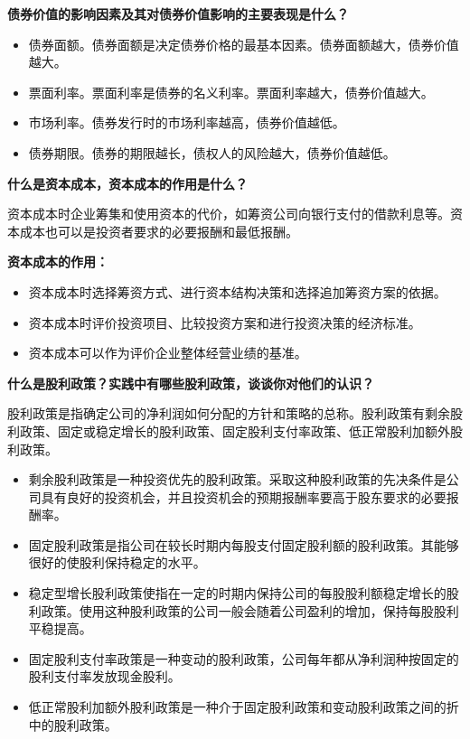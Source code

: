 \documentclass[
  10pt,
  twoside,
  openany,
  b5paper, %
  colorscheme = black, %
  xits = false,
]{qyxf-book}
\begin{document}
 \textbf{债券价值的影响因素及其对债券价值影响的主要表现是什么？}

\begin{note}
	\begin{itemize}
		\item 债券面额。债券面额是决定债券价格的最基本因素。债券面额越大，债券价值越大。
		\item 票面利率。票面利率是债券的名义利率。票面利率越大，债券价值越大。
		\item 市场利率。债券发行时的市场利率越高，债券价值越低。
		\item 债券期限。债券的期限越长，债权人的风险越大，债券价值越低。
	\end{itemize}
\end{note}

 \textbf{什么是资本成本，资本成本的作用是什么？}
\begin{note}
	资本成本时企业筹集和使用资本的代价，如筹资公司向银行支付的借款利息等。资本成本也可以是投资者要求的必要报酬和最低报酬。
	
	\textbf{资本成本的作用：}
	\begin{itemize}
		\item 资本成本时选择筹资方式、进行资本结构决策和选择追加筹资方案的依据。
		\item 资本成本时评价投资项目、比较投资方案和进行投资决策的经济标准。
		\item 资本成本可以作为评价企业整体经营业绩的基准。
	\end{itemize}
\end{note}

 \textbf{什么是股利政策？实践中有哪些股利政策，谈谈你对他们的认识？}
\begin{note}
	股利政策是指确定公司的净利润如何分配的方针和策略的总称。股利政策有剩余股利政策、固定或稳定增长的股利政策、固定股利支付率政策、低正常股利加额外股利政策。
	\begin{itemize}
		\item 剩余股利政策是一种投资优先的股利政策。采取这种股利政策的先决条件是公司具有良好的投资机会，并且投资机会的预期报酬率要高于股东要求的必要报酬率。
		\item 固定股利政策是指公司在较长时期内每股支付固定股利额的股利政策。其能够很好的使股利保持稳定的水平。
		\item 稳定型增长股利政策使指在一定的时期内保持公司的每股股利额稳定增长的股利政策。使用这种股利政策的公司一般会随着公司盈利的增加，保持每股股利平稳提高。
		\item 固定股利支付率政策是一种变动的股利政策，公司每年都从净利润种按固定的股利支付率发放现金股利。
		\item 低正常股利加额外股利政策是一种介于固定股利政策和变动股利政策之间的折中的股利政策。
	\end{itemize}
\end{note}
\end{document}
